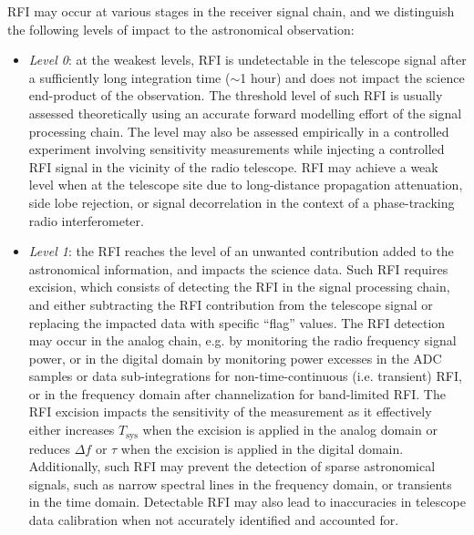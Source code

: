 RFI may occur at various stages in the receiver signal chain, and we distinguish the following levels of impact to the astronomical observation:
\begin{itemize}

\item \emph{Level 0}: at the weakest levels, RFI is undetectable in the telescope signal after a sufficiently long integration time ($\sim$1 hour) and does not impact the science end-product of the observation. The threshold level of such RFI is usually assessed theoretically using an accurate forward modelling effort of the signal processing chain. The level may also be assessed empirically in a controlled experiment involving sensitivity measurements while injecting a controlled RFI signal in the vicinity of the radio telescope. RFI may achieve a weak level when at the telescope site due to long-distance propagation attenuation, side lobe rejection, or signal decorrelation in the context of a phase-tracking radio interferometer.

\item \emph{Level 1}: the RFI reaches the level of an unwanted contribution added to the astronomical information, and impacts the science data. Such RFI requires excision, which consists of detecting the RFI in the signal processing chain, and either subtracting the RFI contribution from the telescope signal or replacing the impacted data with specific ``flag'' values. The RFI detection may occur in the analog chain, e.g. by monitoring the radio frequency signal power, or in the digital domain by monitoring power excesses in the ADC samples or data sub-integrations for non-time-continuous (i.e. transient) RFI, or in the frequency domain after channelization for band-limited RFI. The RFI excision impacts the sensitivity of the measurement as it effectively either increases $T_{\text{sys}}$ when the excision is applied in the analog domain or reduces $\Delta f$ or $\tau$ when the excision is applied in the digital domain. Additionally, such RFI may prevent the detection of sparse astronomical signals, such as narrow spectral lines in the frequency domain, or transients in the time domain. Detectable RFI may also lead to inaccuracies in telescope data calibration when not accurately identified and accounted for.


\end{itemize}
